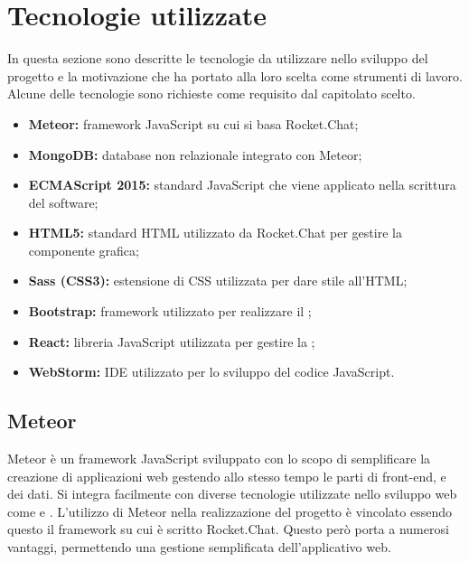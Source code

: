 \section{Tecnologie utilizzate}
In questa sezione sono descritte le tecnologie da utilizzare nello sviluppo del progetto \ProjectName{} e la motivazione che ha portato alla loro scelta come strumenti di lavoro. Alcune delle tecnologie sono richieste come requisito dal capitolato scelto.
\begin{itemize}
	\item \textbf{Meteor:} framework JavaScript su cui si basa Rocket.Chat;
	\item \textbf{MongoDB:} database non relazionale integrato con Meteor;
	\item \textbf{ECMAScript 2015:} standard JavaScript che viene applicato nella scrittura del software;
	\item \textbf{HTML5:} standard HTML utilizzato da Rocket.Chat per gestire la componente grafica;
	\item \textbf{Sass (CSS3):} estensione di CSS utilizzata per dare stile all'HTML; 
	\item \textbf{Bootstrap:} framework utilizzato per realizzare il ;
	\item \textbf{React:} libreria JavaScript utilizzata per gestire la ;
	\item \textbf{WebStorm:} IDE utilizzato per lo sviluppo del codice JavaScript.
\end{itemize}

\subsection{Meteor}
Meteor è un framework JavaScript sviluppato con lo scopo di semplificare la creazione di applicazioni web gestendo allo stesso tempo le parti di front-end,  e dei dati. Si integra facilmente con diverse tecnologie utilizzate nello sviluppo web come  e .
L'utilizzo di Meteor nella realizzazione del progetto è vincolato essendo questo il framework su cui è scritto Rocket.Chat. Questo però porta a numerosi vantaggi, permettendo una gestione semplificata dell'applicativo web.

